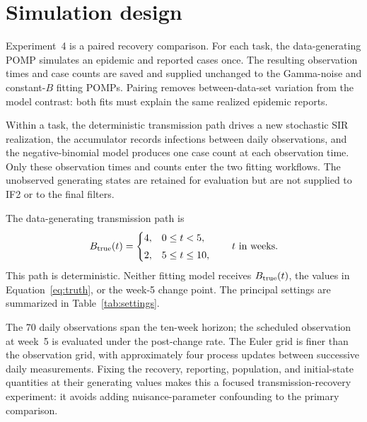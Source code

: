 \section{Simulation design}
\label{sec:design}

Experiment~4 is a paired recovery comparison.  For each task, the
data-generating POMP simulates an epidemic and reported cases once.  The
resulting observation times and case counts are saved and supplied unchanged
to the Gamma-noise and constant-\(B\) fitting POMPs.  Pairing removes
between-data-set variation from the model contrast: both fits must explain the
same realized epidemic reports.

Within a task, the deterministic transmission path drives a new stochastic
SIR realization, the accumulator records infections between daily
observations, and the negative-binomial model produces one case count at each
observation time.  Only these observation times and counts enter the two
fitting workflows.  The unobserved generating states are retained for
evaluation but are not supplied to IF2 or to the final filters.

The data-generating transmission path is
\begin{equation}
B_{\mathrm{true}}(t)
=
\begin{cases}
4, & 0\leq t<5,\\[3pt]
2, & 5\leq t\leq10,
\end{cases}
\qquad \text{\(t\) in weeks.}
\label{eq:truth}
\end{equation}
This path is deterministic.  Neither fitting model receives
\(B_{\mathrm{true}}(t)\), the values in Equation~\ref{eq:truth}, or the week-5 change
point.  The principal settings are summarized in
Table~\ref{tab:settings}.

The 70 daily observations span the ten-week horizon; the scheduled
observation at week~5 is evaluated under the post-change rate.  The Euler grid
is finer than the observation grid, with approximately four
process updates between successive daily measurements.  Fixing the recovery,
reporting, population, and initial-state quantities at their generating values
makes this a focused transmission-recovery experiment: it avoids adding
nuisance-parameter confounding to the primary comparison.

